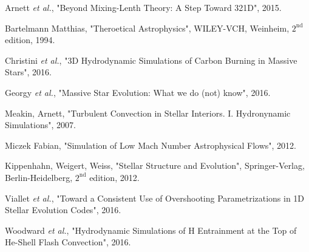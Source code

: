

\begin{thebibliography}{9}
	
		Arnett \emph{et al.},
		  "Beyond Mixing-Lenth Theory: A Step Toward 321D",
			  2015.


		  Bartelmann Matthias,
		  "Theroetical Astrophysics",
		      WILEY-VCH, Weinheim,
		      $\mathrm{2^{nd}}$ edition,
			  1994.
	
		Christini \emph{et al.},
		  "3D Hydrodynamic Simulations of Carbon Burning in Massive Stars",
			  2016.


		Georgy \emph{et al.},
		"Massive Star Evolution: What we do (not) know",
			  2016.

		  Meakin, Arnett,
		  "Turbulent Convection in Stellar Interiors. I. Hydronynamic Simulations",
			  2007.

		Miczek Fabian,
		  "Simulation of Low Mach Number Astrophysical Flows",
			  2012.


	
		  Kippenhahn, Weigert, Weiss,
		  "Stellar Structure and Evolution",
		      Springer-Verlag, Berlin-Heidelberg,
		        $\mathrm{2^{nd}}$ edition,
			  2012.

		Viallet \emph{et al.},
		  "Toward a Consistent Use of Overshooting Parametrizations in 1D Stellar Evolution Codes",
			  2016.

		Woodward \emph{et al.},
		  "Hydrodynamic Simulations of H Entrainment at the Top of He-Shell Flash Convection",
			  2016.
\end{thebibliography}
